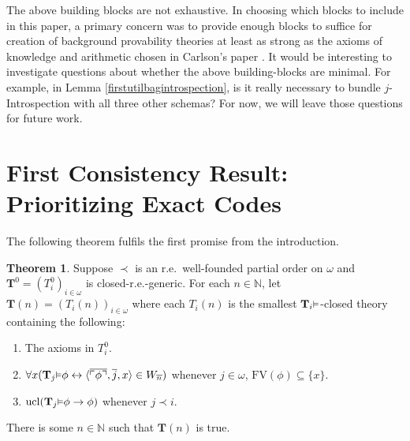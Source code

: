 \documentclass[reqno]{article}
\theoremstyle{definition}
\newtheorem{theorem}{Theorem}
\def\N{\mathbb{N}}
\def\T{\mathbf{T}}
\def\FV{\mathrm{FV}}
\renewcommand{\Pr}[1]{\T_{#1}\mbox{\small${\vDash}$}}
\newcommand{\ucl}[1]{\mathrm{ucl}(#1)}
\begin{document}
The above building blocks are not exhaustive. In choosing which blocks to include
in this paper, a primary concern was to provide enough blocks to suffice for creation
of background provability theories at least as strong as the axioms of knowledge and
arithmetic chosen in Carlson's paper \cite{carlson2000}. It would be interesting to
investigate questions about whether the above building-blocks are minimal. For example,
in Lemma \ref{firstutilbagintrospection}, is it really necessary to bundle
$j$-Introspection with all three other schemas? For now, we will leave those questions
for future work.

\section{First Consistency Result: Prioritizing Exact Codes}

The following theorem fulfils the first promise from the introduction.


\begin{theorem}
\label{onethreethree}
Suppose $\prec$ is an r.e.~well-founded
partial order on $\omega$
and $\T^0=(T^0_i)_{i\in \omega}$ is closed-r.e.-generic.
For each $n\in\N$,
let $\T(n)=(T_i(n))_{i\in \omega}$
where each $T_i(n)$ is the smallest $\Pr i$-closed theory
containing the following:
\begin{enumerate}
\item The axioms in $T^0_i$.
\item $\forall x(\Pr j\phi\leftrightarrow\langle\overline{\ulcorner\phi\urcorner},\overline j,x\rangle\in W_{\overline n})$
whenever $j\in\omega$, 
$\FV(\phi)\subseteq\{x\}$.
\item $\ucl{\Pr j\phi\rightarrow\phi}$ whenever $j\prec i$.
\end{enumerate}
There is some $n\in\N$ such that $\T(n)$ is true.
\end{theorem}
\end{document}
